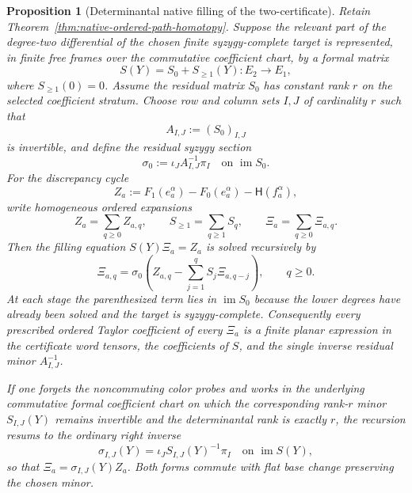 \documentclass[11pt]{article}
\newtheorem{proposition}[theorem]{Proposition}
\theoremstyle{definition}
\begin{document}
\begin{proposition}[Determinantal native filling of the two-certificate]\label{prop:native-two-certificate-minor-filling}
Retain Theorem~\ref{thm:native-ordered-path-homotopy}.  Suppose the relevant
part of the degree-two differential of the chosen finite syzygy-complete
target is represented, in finite free frames over the commutative coefficient
chart, by a formal matrix
\begin{equation}\label{eq:syzygy-differential-matrix}
 S(Y)=S_0+S_{\ge1}(Y):E_2\longrightarrow E_1,
\end{equation}
where $S_{\ge1}(0)=0$.  Assume the residual matrix $S_0$ has constant rank
$r$ on the selected coefficient stratum.  Choose row and column sets $I,J$ of
cardinality $r$ such that
\[
 A_{I,J}:=(S_0)_{I,J}
\]
is invertible, and define the residual syzygy section
\begin{equation}\label{eq:residual-syzygy-section}
 \sigma_0:=\iota_J A_{I,J}^{-1}\pi_I
 \quad\text{on }\operatorname{im}S_0.
\end{equation}
For the discrepancy cycle
\begin{equation}\label{eq:two-certificate-discrepancy}
 Z_a:=F_1(e_a^\alpha)-F_0(e_a^\alpha)
      -\mathsf H(f_a^\alpha),
\end{equation}
write homogeneous ordered expansions
\[
 Z_a=\sum_{q\ge0}Z_{a,q},
 \qquad
 S_{\ge1}=\sum_{q\ge1}S_q,
 \qquad
 \Xi_a=\sum_{q\ge0}\Xi_{a,q}.
\]
Then the filling equation $S(Y)\Xi_a=Z_a$ is solved recursively by
\begin{equation}\label{eq:two-certificate-minor-recursion}
 \boxed{
 \Xi_{a,q}
 =\sigma_0\!\left(
 Z_{a,q}-
 \sum_{j=1}^{q}S_j\Xi_{a,q-j}
 \right),
 \qquad q\ge0.
 }
\end{equation}
At each stage the parenthesized term lies in $\operatorname{im}S_0$ because
the lower degrees have already been solved and the target is syzygy-complete.
Consequently every prescribed ordered Taylor coefficient of every $\Xi_a$ is
a finite planar expression in the certificate word tensors, the coefficients
of $S$, and the single inverse residual minor $A_{I,J}^{-1}$.

If one forgets the noncommuting color probes and works in the underlying
commutative formal coefficient chart on which the corresponding rank-$r$
minor $S_{I,J}(Y)$ remains invertible and the determinantal rank is exactly
$r$, the recursion resums to the ordinary right inverse
\begin{equation}\label{eq:syzygy-minor-section}
 \sigma_{I,J}(Y)
 =\iota_JS_{I,J}(Y)^{-1}\pi_I
 \quad\text{on }\operatorname{im}S(Y),
\end{equation}
so that $\Xi_a=\sigma_{I,J}(Y)Z_a$.  Both forms commute with flat base change
preserving the chosen minor.
\end{proposition}
\end{document}
